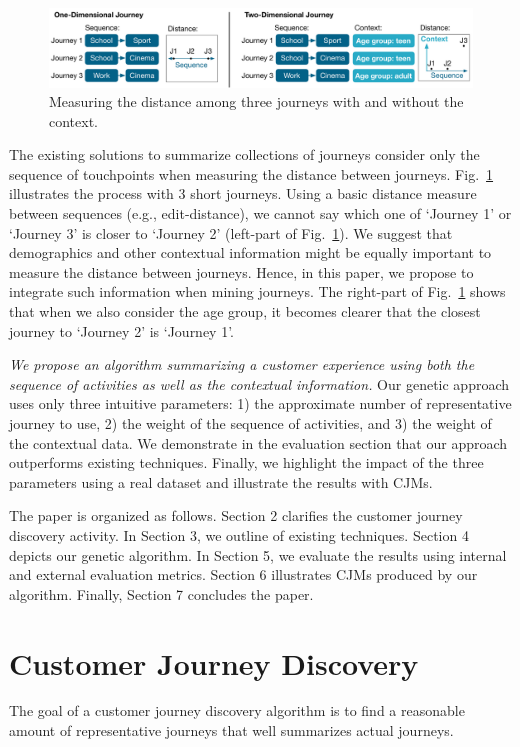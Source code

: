 \documentclass[runningheads]{llncs}
\begin{document}
\begin{figure}[H]
\centering
\includegraphics[width=1\columnwidth]{05_schema/context1.pdf}
\caption{Measuring the distance among three journeys with and without the context.}
\label{context1}
\end{figure}

The existing solutions to summarize collections of journeys \cite{gabadinho2009summarizing,bernard2019genetic} consider only the sequence of touchpoints when measuring the distance between journeys. Fig.~\ref{context1} illustrates the process with 3 short journeys. Using a basic distance measure between sequences (e.g., edit-distance), we cannot say which one of `Journey 1' or `Journey 3' is closer to `Journey 2' (left-part of Fig.~\ref{context1}). We suggest that demographics and other contextual information might be equally important to measure the distance between journeys. Hence, in this paper, we propose to integrate such information when mining journeys. The right-part of Fig.~\ref{context1} shows that when we also consider the age group, it becomes clearer that the closest journey to `Journey 2' is `Journey 1'.

{\it We propose an algorithm summarizing a customer experience using both the sequence of activities as well as the contextual information.} Our genetic approach uses only three intuitive parameters: 1) the approximate number of representative journey to use, 2) the weight of the sequence of activities, and 3) the weight of the contextual data. We demonstrate in the evaluation section that our approach outperforms existing techniques. Finally, we highlight the impact of the three parameters using a real dataset and illustrate the results with CJMs. 

The paper is organized as follows. Section 2 clarifies the customer journey discovery activity. In Section 3, we outline of existing techniques. Section 4 depicts our genetic algorithm. In Section 5, we evaluate the results using internal and external evaluation metrics. Section 6 illustrates CJMs produced by our algorithm. Finally, Section 7 concludes the paper. 


\section{Customer Journey Discovery}
The goal of a customer journey discovery algorithm is to find a reasonable amount of representative journeys that well summarizes actual journeys. 
\end{document}
